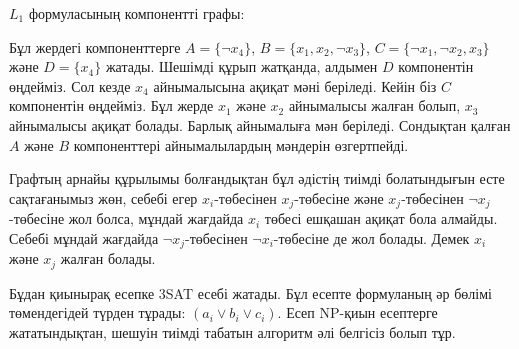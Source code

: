 $L_1$ формуласының компонентті графы:
\begin{center}
\end{center}

Бұл жердегі компоненттерге
$A = \{\lnot x_4\}$,
$B = \{x_1, x_2, \lnot x_3\}$,
$C = \{\lnot x_1, \lnot x_2, x_3\}$ және
$D = \{x_4\}$ жатады.
Шешімді құрып жатқанда, алдымен
$D$ компонентін өңдейміз. Сол кезде $x_4$ айнымалысына
ақиқат мәні беріледі. Кейін біз $C$ компонентін
өңдейміз. Бұл жерде $x_1$ және $x_2$ айнымалысы жалған болып,
$x_3$ айнымалысы ақиқат болады. Барлық айнымалыға мән беріледі.
Сондықтан қалған $A$ және $B$ компоненттері айнымалылардың мәндерін өзгертпейді.

Графтың арнайы
құрылымы болғандықтан бұл әдістің тиімді болатындығын есте сақтағанымыз жөн, себебі егер $x_i$-төбесінен $x_j$-төбесіне және 
$x_j$-төбесінен $\lnot x_j$-төбесіне жол болса, мұндай жағдайда $x_i$ төбесі
ешқашан ақиқат бола алмайды. Себебі мұндай жағдайда
$\lnot x_j$-төбесінен $\lnot x_i$-төбесіне де жол болады. Демек $x_i$ және $x_j$ жалған болады.


Бұдан қиынырақ есепке 3SAT есебі жатады. Бұл есепте формуланың
әр бөлімі төмендегідей түрден тұрады: $(a_i \lor b_i \lor c_i)$.
Есеп NP-қиын есептерге жататындықтан, шешуін тиімді табатын алгоритм әлі белгісіз болып тұр.

